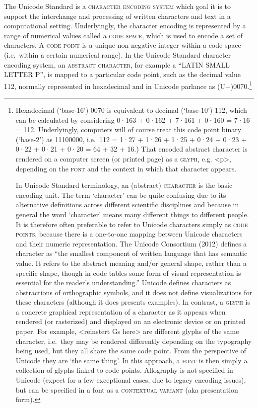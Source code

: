 {{{{{{{{{{{{The Unicode Standard is a \textsc{character encoding system} which goal it is to support the interchange and processing of written characters and text in a computational setting. Underlyingly, the character encoding is represented by a range of numerical values called a \textsc{code space}, which is used to encode a set of characters. A \textsc{code point} is a unique non-negative integer within a code space (i.e.~within a certain numerical range). In the Unicode Standard character encoding system, an \textsc{abstract character}, for example a ``LATIN SMALL LETTER P'', is mapped to a particular code point, such as the decimal value 112, normally represented in hexadecimal and in Unicode parlance as (U+)0070.\footnote{Hexadecimal (`base-16') 0070 is equivalent to decimal (`base-10') 112, which can be calculated by considering 0·163 + 0·162 + 7·161 + 0·160 = 7·16 = 112. Underlyingly, computers will of course treat this code point binary (`base-2') as 11100000, i.e.~112 = 1·27 + 1·26 + 1·25 + 0·24 + 0·23 + 0·22 + 0·21 + 0·20 = 64 + 32 + 16.) That encoded abstract character is rendered on a computer screen (or printed page) as a \textsc{glyph}, e.g. <p>, depending on the \textsc{font} and the context in which that character appears.

In Unicode Standard terminology, an (abstract) \textsc{character} is the basic encoding unit. The term `character' can be quite confusing due to its alternative definitions across different scientific disciplines and because in general the word `character' means many different things to different people. It is therefore often preferable to refer to Unicode characters simply as \textsc{code points}, because there is a one-to-one mapping between Unicode characters and their numeric representation. The Unicode Consortium (2012) defines a character as ``the smallest component of written language that has semantic value. It refers to the abstract meaning and/or general shape, rather than a specific shape, though in code tables some form of visual representation is essential for the reader's understanding.'' Unicode defines characters as abstractions of orthographic symbols, and it does not define visualizations for these characters (although it does presents examples). In contrast, a \textsc{glyph} is a concrete graphical representation of a character as it appears when rendered (or rasterized) and displayed on an electronic device or on printed paper. For example, <reinstert Gs here> are different glyphs of the same character, i.e.~they may be rendered differently depending on the typography being used, but they all share the same code point. From the perspective of Unicode they are `the same thing'. In this approach, a \textsc{font} is then simply a collection of glyphs linked to code points. Allography is not specified in Unicode (expect for a few exceptional cases, due to legacy encoding issues), but can be specified in a font as a \textsc{contextual variant} (aka presentation form).

}}}}}}}}}}}}}
